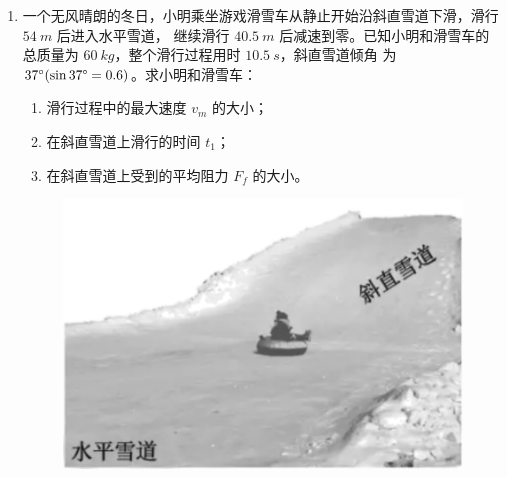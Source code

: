 \begin{enumerate}
\gaokaojs

\item 
一个无风晴朗的冬日，小明乘坐游戏滑雪车从静止开始沿斜直雪道下滑，滑行 $ 54 \ m $ 后进入水平雪道，
继续滑行 $ 40.5 \ m $ 后减速到零。已知小明和滑雪车的总质量为 $ 60 \ kg $，整个滑行过程用时 $ 10.5 \ s $，斜直雪道倾角
为 $ 37 ^{ \circ } (\sin 37 \degree =0.6) $。求小明和滑雪车：
\begin{enumerate}
\item
滑行过程中的最大速度 $ v_{m} $ 的大小；
\item 
在斜直雪道上滑行的时间 $ t_{1} $；
\item 
在斜直雪道上受到的平均阻力 $ F_{f} $ 的大小。

\end{enumerate}
\begin{figure}[h!]
\flushright 
\includegraphics[width=0.23\linewidth]{picture/screenshot039}
\end{figure}





\end{enumerate}
